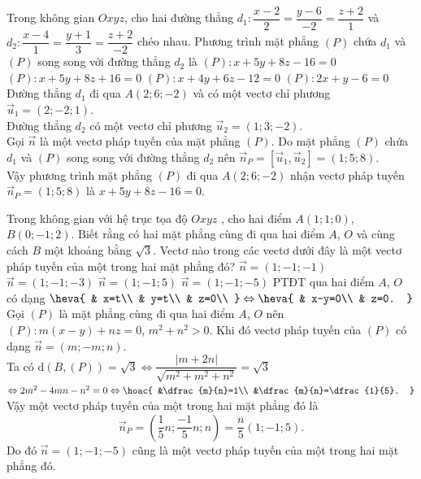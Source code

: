 \begin{ex}%
	Trong không gian $Oxyz$, cho hai đường thẳng $d_1\colon\dfrac{x-2}{2}=\dfrac{y-6}{-2}=\dfrac{z+2}{1}$ và $d_2\colon\dfrac{x-4}{1}=\dfrac{y+1}{3}=\dfrac{z+2}{-2}$ chéo nhau. Phương trình mặt phẳng $(P)$ chứa $d_1$ và $(P)$ song song với đường thẳng $d_2$ là
	\choice
	{\True $(P)\colon x+5y+8z-16=0$}
	{$(P)\colon x+5y+8z+16=0$}
	{$(P)\colon x+4y+6z-12=0$}
	{$(P)\colon 2x+y-6=0$}
	\loigiai
	{
		Đường thẳng $d_1$ đi qua $ A\left(2;6;-2\right)$ và có một vectơ chỉ phương $\overrightarrow{u}_1=\left(2;-2;1\right)$.\\
		Đường thẳng $d_2$ có một vectơ chỉ phương $\overrightarrow{u}_2=(1;3;-2)$.\\
		Gọi $\overrightarrow{n}$ là một vectơ pháp tuyến của mặt phẳng $(P)$. Do mặt phẳng $(P)$ chứa $d_1$ và $(P)$ song song với đường thẳng $d_2$ nên $\overrightarrow{n}_P=\left[\overrightarrow{u}_1,\overrightarrow{u}_2\right]=(1;5;8)$.\\
		Vậy phương trình mặt phẳng $(P)$ đi qua $ A(2;6;-2)$ nhận vectơ pháp tuyến $\overrightarrow{n}_P=(1;5;8)$ là $ x+5y+8z-16=0$.}
\end{ex}

\begin{ex}%
	Trong không gian với hệ trục tọa độ $Oxyz$ , cho hai điểm $ A(1;1;0)$, $ B(0;-1;2)$. Biết rằng có hai mặt phẳng cùng đi qua hai điểm $ A$, $ O$ và cùng cách $ B$ một khoảng bằng $\sqrt{3}$. Vectơ nào trong các vectơ dưới đây là một vectơ pháp tuyến của một trong hai mặt phẳng đó?
	\choice
	{$\overrightarrow{n}=(1;-1;-1)$}
	{$\overrightarrow{n}=(1;-1;-3)$}
	{\True $\overrightarrow{n}=(1;-1;5)$}
	{$\overrightarrow{n}=(1;-1;-5)$}
	\loigiai
	{
		PTĐT qua hai điểm $ A$, $ O$ có dạng $\heva{
			& x=t\\ 
			& y=t\\ 
			& z=0\\ 
		}\Leftrightarrow\heva{
			& x-y=0\\ 
			& z=0.
		}$\\
		Gọi $(P)$ là mặt phẳng cùng đi qua hai điểm $ A$, $ O$ nên $(P)\colon  m\left(x-y\right)+nz=0$, $m^2+n^2>0$. Khi đó vectơ pháp tuyến của $(P)$ có dạng $\overrightarrow{n}=(m;-m;n)$.\\
		Ta có $ \mathrm{d}\left(B,(P)\right)=\sqrt{3}\Leftrightarrow\dfrac{\left| m+2n\right|}{\sqrt{m^2+m^2+n^2}}=\sqrt{3}$ $\Leftrightarrow 2m^2-4mn-n^2=0\Leftrightarrow\hoac{
			&\dfrac{m}{n}=1\\ 
			&\dfrac{m}{n}=\dfrac{1}{5}.
		}$\\
		Vậy một vectơ pháp tuyến của một trong hai mặt phẳng đó là $$\overrightarrow{n}_P=\left(\dfrac{1}{5}n; \dfrac{-1}{5}n; n\right)=\dfrac{n}{5}\left(1; -1; 5\right).$$
		Do đó $\overrightarrow{n}=(1;-1;-5)$ cũng là một vectơ pháp tuyến của một trong hai mặt phẳng đó.}
\end{ex}

